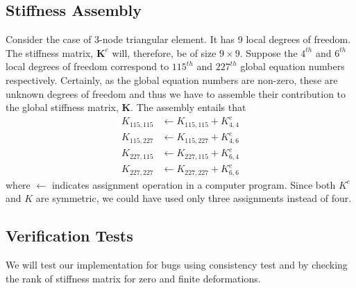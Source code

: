 \documentclass[../main.tex]{subfiles}
\begin{document}
\subsection{Stiffness Assembly}
Consider the case of 3-node triangular element. It has 9 local degrees
of freedom. The stiffness matrix, $\mathbf{K}^e$ will, therefore, be
of size $9\times9$. Suppose the $4^{th}$ and $6^{th}$ local degrees of
freedom correspond to $115^{th}$ and $227^{th}$ global equation
numbers respectively. Certainly, as the global equation numbers are
non-zero, these are unknown degrees of freedom and thus we have to
assemble their contribution to the global stiffness matrix,
$\mathbf{K}$. The assembly entails that
\begin{align*}
  K_{115,115} &\leftarrow K_{115,115} + K^{e}_{4,4} \\
  K_{115,227} &\leftarrow K_{115,227} + K^{e}_{4,6} \\
  K_{227,115} &\leftarrow K_{227,115} + K^{e}_{6,4} \\
  K_{227,227} &\leftarrow K_{227,227} + K^{e}_{6,6} 
\end{align*}
where $\leftarrow$ indicates assignment operation in a computer
program. Since both $K^e$ and $K$ are symmetric, we could have used
only three assignments instead of four.
\subsection{Verification Tests}
We will test our implementation for bugs using consistency test and by
checking the rank of stiffness matrix for zero and finite
deformations.
\end{document}
